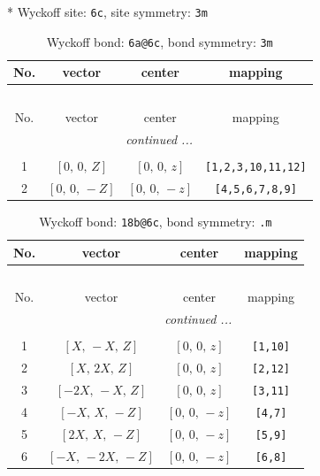 \documentclass[fleqn,8pt]{jsarticle}
\begin{document}
* Wyckoff site: {\tt 6c}, site symmetry: {\tt 3m}
\renewcommand{\arraystretch}{1.2}
\begin{longtable}{cccc}
\caption{Wyckoff bond: {\tt 6a@6c}, bond symmetry: {\tt 3m}}
 \\
 \hline \hline
No. & vector & center & mapping \\ \hline \endfirsthead

\multicolumn{3}{l}{\tablename\ \thetable{}} \\
 \hline \hline
No. & vector & center & mapping \\ \hline \endhead

 \hline \hline
\multicolumn{3}{r}{\footnotesize\it continued ...} \\ \endfoot

 \hline \hline
\multicolumn{3}{r}{} \\ \endlastfoot

1 & $\left[ 0,\, 0,\, Z \right]$ & $\left[ 0,\, 0,\, z \right]$ & {\tt [1,2,3,10,11,12]} \\ \hline
2 & $\left[ 0,\, 0,\, - Z \right]$ & $\left[ 0,\, 0,\, - z \right]$ & {\tt [4,5,6,7,8,9]} \\
\end{longtable}
\renewcommand{\arraystretch}{1.2}
\begin{longtable}{cccc}
\caption{Wyckoff bond: {\tt 18b@6c}, bond symmetry: {\tt .m}}
 \\
 \hline \hline
No. & vector & center & mapping \\ \hline \endfirsthead

\multicolumn{3}{l}{\tablename\ \thetable{}} \\
 \hline \hline
No. & vector & center & mapping \\ \hline \endhead

 \hline \hline
\multicolumn{3}{r}{\footnotesize\it continued ...} \\ \endfoot

 \hline \hline
\multicolumn{3}{r}{} \\ \endlastfoot

1 & $\left[ X,\, - X,\, Z \right]$ & $\left[ 0,\, 0,\, z \right]$ & {\tt [1,10]} \\ \hline
2 & $\left[ X,\, 2 X,\, Z \right]$ & $\left[ 0,\, 0,\, z \right]$ & {\tt [2,12]} \\ \hline
3 & $\left[ - 2 X,\, - X,\, Z \right]$ & $\left[ 0,\, 0,\, z \right]$ & {\tt [3,11]} \\ \hline
4 & $\left[ - X,\, X,\, - Z \right]$ & $\left[ 0,\, 0,\, - z \right]$ & {\tt [4,7]} \\ \hline
5 & $\left[ 2 X,\, X,\, - Z \right]$ & $\left[ 0,\, 0,\, - z \right]$ & {\tt [5,9]} \\ \hline
6 & $\left[ - X,\, - 2 X,\, - Z \right]$ & $\left[ 0,\, 0,\, - z \right]$ & {\tt [6,8]} \\
\end{longtable}
\end{document}
